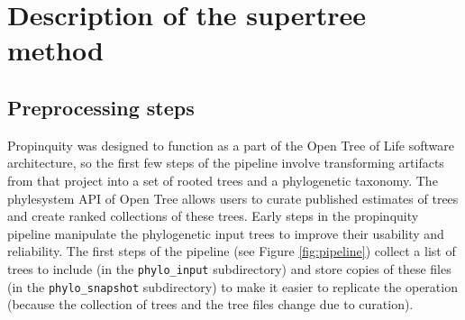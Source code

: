 \documentclass[fleqn,12pt,lineno,english]{wlpeerj}
\begin{document}
\section{Description of the supertree method}

\subsection{Preprocessing steps}

Propinquity was designed to function as a part of the Open Tree of
Life software architecture, so the first few steps of the pipeline
involve transforming artifacts from that project into a set of rooted
trees and a phylogenetic taxonomy. The phylesystem API \citep{McTavishEtAt2015}
of Open Tree allows users to curate published estimates of trees and
create ranked collections of these trees. Early steps in the propinquity
pipeline manipulate the phylogenetic input trees to improve their
usability and reliability. The first steps of the pipeline (see Figure
\ref{fig:pipeline}) collect a list of trees to include (in the \texttt{phylo\_input}
subdirectory) and store copies of these files (in the \texttt{phylo\_snapshot}
subdirectory) to make it easier to replicate the operation (because
the collection of trees and the tree files change due to curation).
\end{document}
